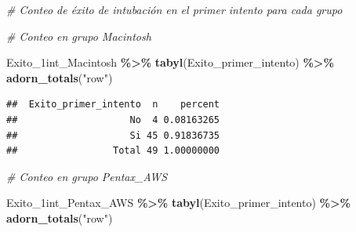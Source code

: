 \documentclass[
]{article}
\newenvironment{Shaded}{\begin{snugshade}}{\end{snugshade}}
\newcommand{\CommentTok}[1]{\textcolor[rgb]{0.56,0.35,0.01}{\textit{#1}}}
\newcommand{\FunctionTok}[1]{\textcolor[rgb]{0.13,0.29,0.53}{\textbf{#1}}}
\newcommand{\NormalTok}[1]{#1}
\newcommand{\OtherTok}[1]{\textcolor[rgb]{0.56,0.35,0.01}{#1}}
\newcommand{\SpecialCharTok}[1]{\textcolor[rgb]{0.81,0.36,0.00}{\textbf{#1}}}
\newcommand{\StringTok}[1]{\textcolor[rgb]{0.31,0.60,0.02}{#1}}
\begin{document}
\begin{Shaded}
\end{Shaded}

\begin{Shaded}
\begin{Highlighting}[]
\CommentTok{\# Conteo de éxito de intubación en el primer intento para cada grupo}

\CommentTok{\# Conteo en grupo Macintosh}

\NormalTok{Exito\_1int\_Macintosh }\SpecialCharTok{\%\textgreater{}\%}  
  \FunctionTok{tabyl}\NormalTok{(Exito\_primer\_intento) }\SpecialCharTok{\%\textgreater{}\%} 
  \FunctionTok{adorn\_totals}\NormalTok{(}\StringTok{"row"}\NormalTok{)}
\end{Highlighting}
\end{Shaded}

\begin{verbatim}
##  Exito_primer_intento  n    percent
##                    No  4 0.08163265
##                    Si 45 0.91836735
##                 Total 49 1.00000000
\end{verbatim}

\begin{Shaded}
\begin{Highlighting}[]
\CommentTok{\# Conteo en grupo Pentax\_AWS}

\NormalTok{Exito\_1int\_Pentax\_AWS }\SpecialCharTok{\%\textgreater{}\%}  
  \FunctionTok{tabyl}\NormalTok{(Exito\_primer\_intento) }\SpecialCharTok{\%\textgreater{}\%} 
  \FunctionTok{adorn\_totals}\NormalTok{(}\StringTok{"row"}\NormalTok{)}
\end{Highlighting}
\end{Shaded}
\end{document}
